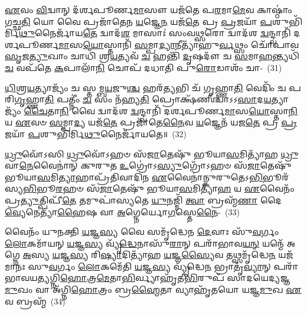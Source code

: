 \-\ul{𑌏}\-𑌵𑌂 \ul{𑌵𑌿}\-𑌦𑍍𑌵𑌾𑌨𑍍 𑌦᳴𑌰𑍍\mbox{}𑌶𑌪𑍂𑌰𑍍𑌣\-\ul{𑌮𑌾}\-𑌸𑍗 𑌯𑌜᳴𑌤𑍇 𑌪\-\ul{𑌰}\-𑌮𑌾\-\ul{𑌮𑍇}\-𑌵 𑌕𑌾𑌷𑍍𑌠𑌾𑌂॑ 𑌗𑌚𑍍𑌛\-\ul{𑌤𑌿} 𑌯𑍋 𑌵𑍈 𑌪𑍍𑌰𑌜𑌾᳴𑌤𑍇𑌨 \ul{𑌯}\-𑌜𑍍𑌞𑍇\-\ul{𑌨} 𑌯𑌜᳴\-\ul{𑌤𑍇} 𑌪𑍍𑌰 \ul{𑌪𑍍𑌰}\-𑌜𑌯𑌾᳴ \ul{𑌪}\-𑌶𑍁𑌭𑌿᳴𑌰𑍍𑌮𑌿\-\ul{𑌥𑍁}\-𑌨𑍈𑌰𑍍𑌜𑌾᳴𑌯\-\ul{𑌤𑍇} 𑌦𑍍𑌵𑌾𑌦᳴\-\ul{𑌶} 𑌮𑌾𑌸𑌾𑌃॑ 𑌸𑌂𑌵\-\ul{𑌥𑍍𑌸}\-𑌰𑍋 𑌦𑍍𑌵𑌾𑌦᳴𑌶 \ul{𑌦𑍍𑌵}\-𑌨𑍍𑌦𑍍𑌵𑌾𑌨𑌿᳴ 𑌦𑌰𑍍\mbox{}𑌶𑌪𑍂𑌰𑍍𑌣\-\ul{𑌮𑌾}\-𑌸\-\ul{𑌯𑍋}\-𑌸𑍍𑌤𑌾𑌨𑌿᳴ \ul{𑌸}\-𑌮𑍍𑌪𑌾\-\ul{𑌦𑍍𑌯𑌾}\-𑌨𑍀𑌤𑍍𑌯𑌾᳴𑌹𑍁\-\ul{𑌰𑍍𑌵}\-𑌥𑍍𑌸𑌂 𑌚𑍋᳴𑌪𑌾𑌵\-\ul{𑌸𑍃}\-𑌜\-\ul{𑌤𑍍𑌯𑍁}\-𑌖𑌾𑌂 𑌚𑌾𑌧𑌿᳴ 𑌶𑍍𑌰\-\ul{𑌯}\-𑌤𑍍𑌯𑌵᳴ \ul{𑌚} 𑌹𑌨𑍍𑌤𑌿᳴ \ul{𑌦𑍃}\-𑌷𑌦𑍗᳴ 𑌚 \ul{𑌸}\-𑌮𑌾\-\ul{𑌹}\-𑌨𑍍𑌤𑍍𑌯𑌧𑌿᳴ \ul{𑌚} 𑌵𑌪᳴𑌤𑍇 \ul{𑌕}\-𑌪𑌾𑌲𑌾᳴\-\ul{𑌨𑌿} 𑌚𑍋𑌪᳴ 𑌦𑌧𑌾𑌤𑌿 𑌪𑍁\-\ul{𑌰𑍋}\-𑌡𑌾𑌶𑌂᳴ 𑌚𑌾-~(31)

\-\ul{𑌧𑌿}\-𑌶𑍍𑌰\-\ul{𑌯}\-𑌤𑍍𑌯𑌾𑌜𑍍𑌯𑌂᳴ 𑌚 𑌸𑍍𑌤𑌮𑍍𑌬\-\ul{𑌯}\-𑌜𑍁\-\ul{𑌶𑍍𑌚} 𑌹𑌰᳴\-\ul{𑌤𑍍𑌯}\-𑌭𑌿 𑌚᳴ 𑌗𑍃𑌹𑍍𑌣𑌾\-\ul{𑌤𑌿} 𑌵𑍇𑌦𑌿𑌂᳴ 𑌚 𑌪𑌰𑌿\-\ul{𑌗𑍃}\-𑌹𑍍𑌣𑌾\-\ul{𑌤𑌿} 𑌪𑌤𑍍𑌨𑍀𑌂॑ \ul{𑌚} 𑌸𑌂 𑌨᳴𑌹𑍍𑌯\-\ul{𑌤𑌿} 𑌪𑍍𑌰𑍋𑌕𑍍𑌷᳴𑌣𑍀𑌶𑍍𑌚𑌾\-𑌽\-𑌽\-\ul{𑌸𑌾}\-𑌦\-\ul{𑌯}\-𑌤𑍍𑌯𑌾𑌜𑍍𑌯𑌂᳴ \ul{𑌚𑍈}\-𑌤𑌾\-\ul{𑌨𑌿} 𑌵𑍈 𑌦𑍍𑌵𑌾𑌦᳴𑌶 \ul{𑌦𑍍𑌵}\-𑌨𑍍𑌦𑍍𑌵𑌾𑌨𑌿᳴ 𑌦𑌰𑍍\mbox{}𑌶𑌪𑍂𑌰𑍍𑌣\-\ul{𑌮𑌾}\-𑌸\-\ul{𑌯𑍋}\-𑌸𑍍𑌤𑌾\-\ul{𑌨𑌿} 𑌯 \ul{𑌏}\-𑌵𑍞 \ul{𑌸}\-𑌮𑍍𑌪𑌾\-\ul{𑌦𑍍𑌯} 𑌯𑌜᳴\-\ul{𑌤𑍇} 𑌪𑍍𑌰𑌜𑌾᳴𑌤𑍇\-\ul{𑌨𑍈}\-𑌵 \ul{𑌯}\-𑌜𑍍𑌞𑍇𑌨᳴ 𑌯𑌜\-\ul{𑌤𑍇} 𑌪𑍍𑌰 \ul{𑌪𑍍𑌰}\-𑌜𑌯𑌾᳴ \ul{𑌪}\-𑌶𑍁𑌭𑌿᳴𑌰𑍍𑌮𑌿\-\ul{𑌥𑍁}\-𑌨𑍈𑌰𑍍𑌜𑌾᳴𑌯𑌤𑍇॥~(32)

{\anuvakamend[{\-\ul{𑌉}\-𑌕𑍍𑌥𑍍𑌯𑍇᳴𑌨𑍋\-\ul{𑌪𑌾}\-𑌪𑍍𑌨𑍋𑌤𑍍𑌯᳴𑌗𑌚𑍍𑌛\-\ul{𑌤𑌾𑌂} 𑌯𑌃 𑌪𑍁᳴\-\ul{𑌰𑍋}\-𑌡𑌾𑌶𑌂᳴ 𑌚 𑌚𑌤𑍍𑌵𑌾\-\ul{𑌰𑌿}\-\-\ul{𑍞}\-𑌶𑌚𑍍𑌚᳴}]}%

\-\ul{𑌧𑍍𑌰𑍁}\-𑌵𑍋᳴\-𑌽𑌸𑌿 \ul{𑌧𑍍𑌰𑍁}\-𑌵𑍋᳴\-𑌽𑌹𑍞 𑌸᳴\-\ul{𑌜𑌾}\-𑌤𑍇𑌷𑍁᳴ 𑌭𑍂𑌯𑌾\-\ul{𑌸}\-𑌮𑌿𑌤𑍍𑌯𑌾᳴𑌹 \ul{𑌧𑍍𑌰𑍁}\-𑌵𑌾\-\ul{𑌨𑍇}\-𑌵𑍈𑌨𑌾॑𑌨𑍍 𑌕𑍁𑌰𑍁𑌤 \ul{𑌉}\-𑌗𑍍𑌰𑍋॑\-𑌽\-\ul{𑌸𑍍𑌯𑍁}\-𑌗𑍍𑌰𑍋᳴\-𑌽𑌹𑍞 𑌸᳴\-\ul{𑌜𑌾}\-𑌤𑍇𑌷𑍁᳴ 𑌭𑍂𑌯𑌾\-\ul{𑌸}\-𑌮𑌿\-\ul{𑌤𑍍𑌯𑌾}\-𑌹𑌾𑌪𑍍𑌰᳴𑌤𑌿𑌵𑌾𑌦𑌿𑌨 \ul{𑌏}\-𑌵𑍈𑌨𑌾॑𑌨𑍍𑌕𑍁𑌰𑍁𑌤𑍇\-𑌽\-\ul{𑌭𑌿}\-𑌭𑍂𑌰᳴𑌸𑍍𑌯\-\ul{𑌭𑌿}\-𑌭𑍂\-\ul{𑌰}\-𑌹𑍞 𑌸᳴\-\ul{𑌜𑌾}\-𑌤𑍇𑌷𑍁᳴ 𑌭𑍂𑌯𑌾\-\ul{𑌸}\-𑌮𑌿𑌤𑍍𑌯𑌾᳴\-\ul{𑌹} 𑌯 \ul{𑌏}\-𑌵𑍈𑌨𑌂᳴ 𑌪𑍍𑌰\-\ul{𑌤𑍍𑌯𑍁}\-𑌤𑍍𑌪𑌿𑌪𑍀᳴\-\ul{𑌤𑍇} 𑌤𑌮𑍁𑌪𑌾॑𑌸𑍍𑌯𑌤𑍇 \ul{𑌯𑍁}\-𑌨𑌜𑍍𑌮𑌿᳴ \ul{𑌤𑍍𑌵𑌾} 𑌬𑍍𑌰𑌹𑍍𑌮᳴\-\ul{𑌣𑌾} 𑌦𑍈\-\ul{𑌵𑍍𑌯𑍇}\-𑌨𑍇𑌤𑍍𑌯𑌾᳴\-\ul{𑌹𑍈}\-𑌷 𑌵𑌾 \ul{𑌅}\-𑌗𑍍𑌨𑍇𑌰𑍍𑌯𑍋\-\ul{𑌗}\-𑌸𑍍𑌤𑍇\-\ul{𑌨𑍈}\--~(33)

𑌵𑍈𑌨𑌂᳴ 𑌯𑍁𑌨𑌕𑍍𑌤𑌿 \ul{𑌯}\-𑌜𑍍𑌞\-\ul{𑌸𑍍𑌯} 𑌵𑍈 𑌸𑌮𑍃᳴𑌦𑍍𑌧𑍇𑌨 \ul{𑌦𑍇}\-𑌵𑌾𑌃 𑌸𑍁᳴\-\ul{𑌵}\-𑌰𑍍𑌗𑌂 \ul{𑌲𑍋}\-𑌕𑌮𑌾᳴𑌯𑌨𑍍 \ul{𑌯}\-𑌜𑍍𑌞\-\ul{𑌸𑍍𑌯} 𑌵𑍍𑌯𑍃᳴\-\ul{𑌦𑍍𑌧𑍇}\-𑌨𑌾𑌸𑍁᳴\-\ul{𑌰𑌾}\-𑌨𑍍 𑌪𑌰𑌾᳴𑌭𑌾𑌵\-\ul{𑌯}\-\-\ul{𑌨𑍍} 𑌯𑌨𑍍𑌮𑍇᳴ 𑌅𑌗𑍍𑌨𑍇 \ul{𑌅}\-𑌸𑍍𑌯 \ul{𑌯}\-𑌜𑍍𑌞\-\ul{𑌸𑍍𑌯} 𑌰𑌿\-\ul{𑌷𑍍𑌯𑌾}\-𑌦𑌿𑌤𑍍𑌯𑌾᳴𑌹 \ul{𑌯}\-𑌜𑍍𑌞\-\ul{𑌸𑍍𑌯𑍈}\-𑌵 𑌤𑌥𑍍𑌸𑌮𑍃᳴𑌦𑍍𑌧𑍇\-\ul{𑌨} 𑌯𑌜᳴𑌮𑌾𑌨𑌃 𑌸𑍁\-\ul{𑌵}\-𑌰𑍍𑌗𑌂 \ul{𑌲𑍋}\-𑌕𑌮𑍇᳴𑌤𑌿 \ul{𑌯}\-𑌜𑍍𑌞\-\ul{𑌸𑍍𑌯} 𑌵𑍍𑌯𑍃᳴𑌦𑍍𑌧𑍇\-\ul{𑌨} 𑌭𑍍𑌰𑌾𑌤𑍃᳴\-\ul{𑌵𑍍𑌯𑌾}\-𑌨𑍍 𑌪𑌰𑌾᳴ 𑌭𑌾𑌵𑌯𑌤𑍍𑌯𑌗𑍍𑌨𑌿\-\ul{𑌹𑍋}\-𑌤𑍍𑌰\-\ul{𑌮𑍇}\-𑌤𑌾\-\ul{𑌭𑌿}\-𑌰𑍍𑌵𑍍𑌯𑌾𑌹𑍃᳴𑌤𑍀\-\ul{𑌭𑌿}\-𑌰𑍁𑌪᳴ 𑌸𑌾𑌦𑌯𑍇𑌦𑍍𑌯𑌜𑍍𑌞\-\ul{𑌮𑍁}\-𑌖𑌂 𑌵𑌾 𑌅᳴𑌗𑍍𑌨𑌿\-\ul{𑌹𑍋}\-𑌤𑍍𑌰𑌂 𑌬𑍍𑌰\-\ul{𑌹𑍍𑌮𑍈}\-𑌤𑌾 𑌵𑍍𑌯𑌾𑌹𑍃᳴𑌤𑌯𑍋 𑌯𑌜𑍍𑌞\-\ul{𑌮𑍁}\-𑌖 \ul{𑌏}\-𑌵 𑌬𑍍𑌰𑌹𑍍𑌮᳴~(34)

